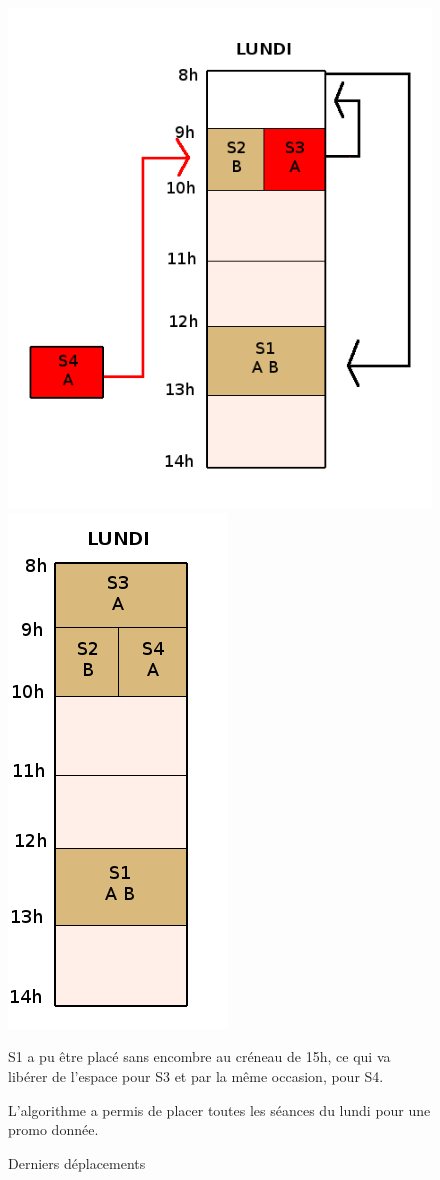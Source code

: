 \documentclass[12pt,a4paper,openany]{memoir}
\begin{document}
\begin{figure}[H]
    \includegraphics[scale=0.3]{img/Schema/Etape_6.png}\hfill
    \includegraphics[scale=0.3]{img/Schema/Etape_7.png}
    \caption{Derniers déplacements} \medbreak
    \par S1 a pu être placé sans encombre au créneau de 15h, ce qui va libérer de l'espace pour S3 et par la même occasion, pour S4.
    \par L'algorithme a permis de placer toutes les séances du lundi pour une promo donnée.
\end{figure}
\clearpage
\end{document}
